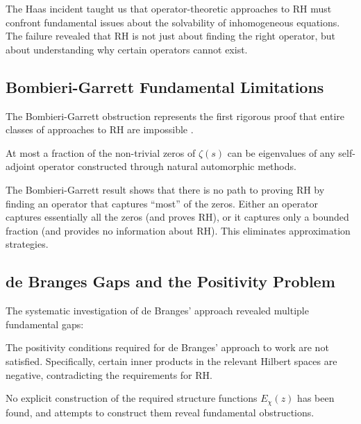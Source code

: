 \begin{lesson}
The Haas incident taught us that operator-theoretic approaches to RH must confront fundamental issues about the solvability of inhomogeneous equations. The failure revealed that RH is not just about finding the right operator, but about understanding why certain operators cannot exist.
\end{lesson}

\subsection{Bombieri-Garrett Fundamental Limitations}
\label{subsec:bombieri_garrett_lessons}

The Bombieri-Garrett obstruction represents the first rigorous proof that entire classes of approaches to RH are impossible \cite{bombieri1995}.

\begin{theorem}
At most a fraction of the non-trivial zeros of $\zeta(s)$ can be eigenvalues of any self-adjoint operator constructed through natural automorphic methods.
\end{theorem}

\begin{lesson}
The Bombieri-Garrett result shows that there is no path to proving RH by finding an operator that captures ``most'' of the zeros. Either an operator captures essentially all the zeros (and proves RH), or it captures only a bounded fraction (and provides no information about RH). This eliminates approximation strategies.
\end{lesson}

\subsection{de Branges Gaps and the Positivity Problem}
\label{subsec:debranges_gaps}

The systematic investigation of de Branges' approach revealed multiple fundamental gaps:

\begin{theorem}
The positivity conditions required for de Branges' approach to work are not satisfied. Specifically, certain inner products in the relevant Hilbert spaces are negative, contradicting the requirements for RH.
\end{theorem}

\begin{theorem}
No explicit construction of the required structure functions $E_\chi(z)$ has been found, and attempts to construct them reveal fundamental obstructions.
\end{theorem}

